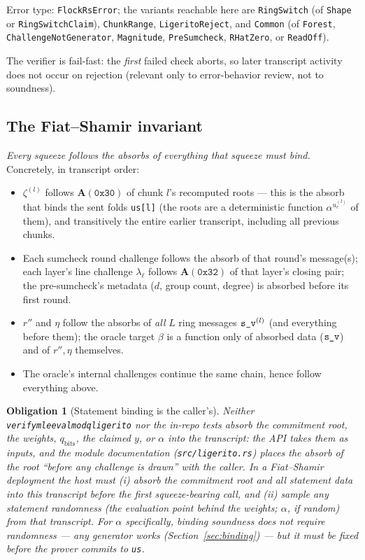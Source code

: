\documentclass[11pt]{article}
\newcommand{\code}[1]{{\def\_{\textunderscore\allowbreak}\texttt{#1}}}
\newtheorem{obligation}{Obligation}
\begin{document}
{\sloppy
Error type: \code{FlockRsError}; the variants reachable here are
\code{RingSwitch} (of \code{Shape} or \code{RingSwitchClaim}),
\code{ChunkRange}, \code{LigeritoReject}, and \code{Common} (of
\code{Forest}, \code{ChallengeNotGenerator}, \code{Magnitude},
\code{PreSumcheck}, \code{RHatZero}, or \code{ReadOff}).\par}
The verifier is
fail-fast: the \emph{first} failed check aborts, so later transcript
activity does not occur on rejection (relevant only to error-behavior
review, not to soundness).

\subsection{The Fiat--Shamir invariant}
\label{sec:fsinvariant}

\emph{Every squeeze follows the absorbs of everything that squeeze must
bind.}  Concretely, in transcript order:
\begin{itemize}[itemsep=1pt]
\item $\zeta^{(l)}$ follows $\mathbf{A}(\mathtt{0x30})$ of chunk $l$'s
  recomputed roots — this is the absorb that binds the sent folds
  \code{us[l]} (the roots are a deterministic function
  $\alpha^{u^{(l)}_c}$ of them), and transitively the entire earlier
  transcript, including all previous chunks.
\item Each sumcheck round challenge follows the absorb of that round's
  message(s); each layer's line challenge $\lambda_\ell$ follows
  $\mathbf{A}(\mathtt{0x32})$ of that layer's closing pair; the
  pre-sumcheck's metadata ($d$, group count, degree) is absorbed before
  its first round.
\item $r''$ and $\eta$ follow the absorbs of \emph{all} $L$ ring
  messages $\code{s\_v}^{(l)}$ (and everything before them); the oracle
  target $\beta$ is a function only of absorbed data
  ($\code{s\_v}$) and of $r'', \eta$ themselves.
\item The oracle's internal challenges continue the same chain, hence
  follow everything above.
\end{itemize}

\begin{obligation}[Statement binding is the caller's]
\label{ob:root}
Neither \code{verify\_mle\_eval\_mod\_q\_ligerito} nor the in-repo tests
absorb the commitment root, the weights, $q_{\mathrm{bits}}$, the claimed
$y$, or $\alpha$ into the transcript: the API takes them as inputs, and
the module documentation (\code{src/ligerito.rs}) places the absorb of the
root ``before any challenge is drawn'' with the \emph{caller}.  In a
Fiat--Shamir deployment the host must (i) absorb the commitment root and
all statement data into this transcript before the first squeeze-bearing
call, and (ii) sample any statement randomness (the evaluation point
behind the weights; $\alpha$, if random) from that transcript.  For
$\alpha$ specifically, binding soundness does not require randomness —
any \emph{generator} works (Section~\ref{sec:binding}) — but it must be
fixed before the prover commits to \code{us}.
\end{obligation}
\end{document}
